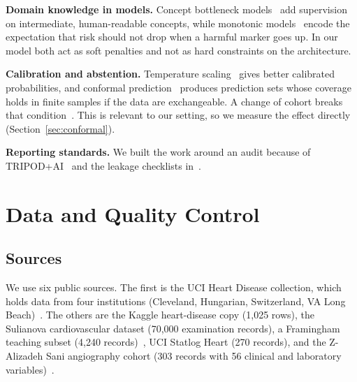 \documentclass[conference]{IEEEtran}
\begin{document}
\textbf{Domain knowledge in models.} Concept bottleneck models~\cite{koh2020} add supervision on intermediate, human-readable concepts, while monotonic models~\cite{gupta2016} encode the expectation that risk should not drop when a harmful marker goes up. In our model both act as soft penalties and not as hard constraints on the architecture.

\textbf{Calibration and abstention.} Temperature scaling~\cite{guo2017} gives better calibrated probabilities, and conformal prediction~\cite{vovk2005,angelopoulos2023} produces prediction sets whose coverage holds in finite samples if the data are exchangeable. A change of cohort breaks that condition~\cite{tibshirani2019,barber2023}. This is relevant to our setting, so we measure the effect directly (Section~\ref{sec:conformal}).

\textbf{Reporting standards.} We built the work around an audit because of TRIPOD+AI~\cite{collins2024} and the leakage checklists in~\cite{kapoor2023}.

\section{Data and Quality Control}\label{sec:data}
\subsection{Sources}
We use six public sources. The first is the UCI Heart Disease collection, which holds data from four institutions (Cleveland, Hungarian, Switzerland, VA Long Beach)~\cite{dua2019,detrano1989}. The others are the Kaggle heart-disease copy (1{,}025 rows), the Sulianova cardiovascular dataset (70{,}000 examination records), a Framingham teaching subset (4{,}240 records)~\cite{dawber1951}, UCI Statlog Heart (270 records), and the Z-Alizadeh Sani angiography cohort (303 records with 56 clinical and laboratory variables)~\cite{alizadehsani2013}.
\end{document}
